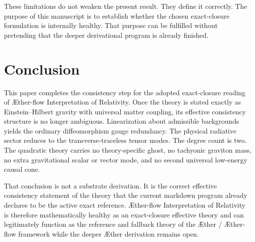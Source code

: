 \documentclass[11pt]{article}
\newcommand{\Aether}{\AE{}ther}
\newcommand{\Aflow}{\AE{}ther-flow}
\newcommand{\TheoryName}{\Aflow{} Interpretation of Relativity}
\newcommand{\TheoryProgram}{\Aether{} / \Aflow{} framework}
\begin{document}
These limitations do not weaken the present result. They define it correctly. The purpose of this manuscript is to establish whether the chosen exact-closure formulation is internally healthy. That purpose can be fulfilled without pretending that the deeper derivational program is already finished.

\section{Conclusion}

This paper completes the consistency step for the adopted exact-closure reading of \TheoryName{}. Once the theory is stated exactly as Einstein--Hilbert gravity with universal matter coupling, its effective consistency structure is no longer ambiguous. Linearization about admissible backgrounds yields the ordinary diffeomorphism gauge redundancy. The physical radiative sector reduces to the transverse-traceless tensor modes. The degree count is two. The quadratic theory carries no theory-specific ghost, no tachyonic graviton mass, no extra gravitational scalar or vector mode, and no second universal low-energy causal cone.

That conclusion is not a substrate derivation. It is the correct effective consistency statement of the theory that the current markdown program already declares to be the active exact reference. \TheoryName{} is therefore mathematically healthy as an exact-closure effective theory and can legitimately function as the reference and fallback theory of the \TheoryProgram{} while the deeper \Aether{} derivation remains open.
\end{document}

